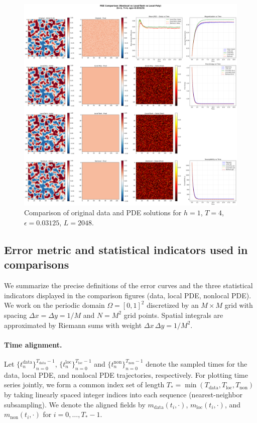 \documentclass[11pt,a4paper]{article}
\begin{document}
\begin{figure}[h]
    \centering
    \includegraphics[width=1.0\textwidth]{fig/compare_pde_solvers_L2048_h1_T4_eps0.03125.png}
    \caption{Comparison of original data and PDE solutions for $h=1$, $T=4$, $\epsilon=0.03125$, $L=2048$.}
    \label{fig:pde_comparison_h1_T4_eps0.03125_L2048}
\end{figure}



\subsection{Error metric and statistical indicators used in comparisons}
\label{sec:error_and_stats}

We summarize the precise definitions of the error curves and the three statistical indicators displayed in the comparison figures (data, local PDE, nonlocal PDE). We work on the periodic domain $\Omega=[0,1]^2$ discretized by an $M\times M$ grid with spacing $\Delta x = \Delta y = 1/M$ and $N=M^2$ grid points. Spatial integrals are approximated by Riemann sums with weight $\Delta x\,\Delta y = 1/M^2$.

\paragraph{Time alignment.} Let $\{t^{\text{data}}_n\}_{n=0}^{T_{\text{data}}-1}$, $\{t^{\text{loc}}_n\}_{n=0}^{T_{\text{loc}}-1}$ and $\{t^{\text{non}}_n\}_{n=0}^{T_{\text{non}}-1}$ denote the sampled times for the data, local PDE, and nonlocal PDE trajectories, respectively. For plotting time series jointly, we form a common index set of length $T_\ast=\min(T_{\text{data}},T_{\text{loc}},T_{\text{non}})$ by taking linearly spaced integer indices into each sequence (nearest-neighbor subsampling). We denote the aligned fields by $m_{\text{data}}(t_i,\cdot)$, $m_{\text{loc}}(t_i,\cdot)$, and $m_{\text{non}}(t_i,\cdot)$ for $i=0,\dots,T_\ast-1$.
\end{document}
